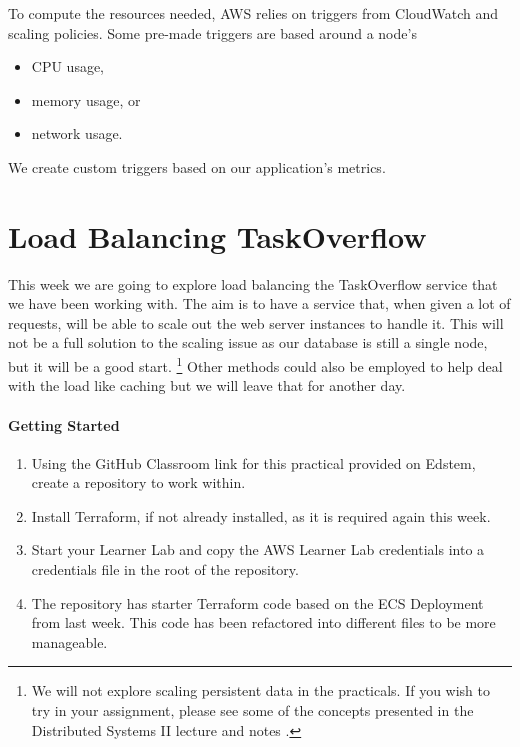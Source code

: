 \documentclass{csse4400}
\begin{document}
To compute the resources needed, AWS relies on triggers from CloudWatch and scaling policies.
Some pre-made triggers are based around a node's

\begin{itemize}
    \item CPU usage,
    \item memory usage, or 
    \item network usage.
\end{itemize}

We create custom triggers based on our application's metrics.


\section{Load Balancing TaskOverflow}

This week we are going to explore load balancing the TaskOverflow service that we have been working with.
The aim is to have a service that, when given a lot of requests,
will be able to scale out the web server instances to handle it.
This will not be a full solution to the scaling issue as our database is still a single node,
but it will be a good start.%
\footnote{We will not explore scaling persistent data in the practicals.
If you wish to try in your assignment,
please see some of the concepts presented in the Distributed Systems II lecture
\cite{distributed2-slides} and notes \cite{distributed2-notes}.}
Other methods could also be employed to help deal with the load like caching but we will leave that for another day.

\paragraph{Getting Started}
\begin{enumerate}
    \item Using the GitHub Classroom link for this practical provided on Edstem, create a repository to work within.
    \item Install Terraform, if not already installed, as it is required again this week.
    \item Start your Learner Lab and copy the AWS Learner Lab credentials into a credentials file in the root of the repository.
    \item The repository has starter Terraform code based on the ECS Deployment from last week.
          This code has been refactored into different files to be more manageable.
\end{enumerate}
\end{document}
